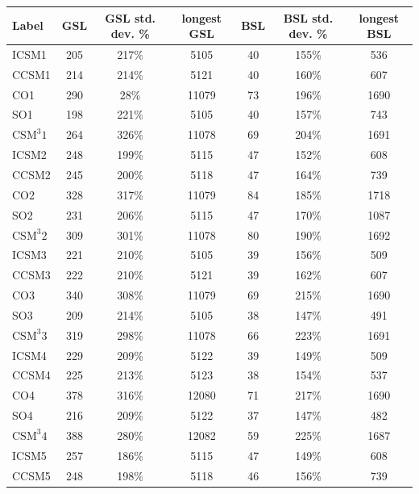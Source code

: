 \documentclass[12pt]{article}
\begin{document}
\begin{table}
  \begin{tabular}{| l | c | c | c | c | c | c |}\hline
    Label & GSL & GSL std. dev. \% & longest GSL & BSL & BSL std. dev. \% & longest BSL  \\\hline
    ICSM1 & 205 & 217\% & 5105 & 40 & 155\% & 536 \\\hline
    CCSM1 & 214 & 214\% & 5121 & 40 & 160\% & 607 \\\hline
    CO1 & 290 & 28\% & 11079 & 73 & 196\% & 1690 \\\hline
    SO1 & 198 & 221\% & 5105 & 40 & 157\% & 743 \\\hline
    $\text{CSM}^{3}1$ & 264 & 326\% & 11078 & 69 & 204\% & 1691 \\\hline\hline
%
    ICSM2 & 248 & 199\% & 5115 & 47 & 152\% & 608 \\\hline
    CCSM2 &245 & 200\% & 5118 & 47 & 164\% & 739 \\\hline
    CO2 & 328 & 317\% & 11079 & 84 & 185\% & 1718 \\\hline
    SO2 & 231 & 206\% & 5115 & 47 & 170\% & 1087 \\\hline
    $\text{CSM}^{3}2$ & 309 & 301\% & 11078 & 80 & 190\% & 1692 \\\hline\hline
%
    ICSM3 & 221 & 210\% & 5105 & 39 & 156\% & 509 \\\hline
    CCSM3 & 222 & 210\% & 5121 & 39 & 162\% & 607 \\\hline
    CO3 & 340 & 308\% & 11079 & 69 & 215\% & 1690 \\\hline
    SO3 & 209 & 214\% & 5105 & 38 & 147\% & 491 \\\hline
    $\text{CSM}^{3}3$ & 319 & 298\% & 11078 & 66 & 223\% & 1691 \\\hline\hline
%
    ICSM4 & 229 & 209\% & 5122 & 39 & 149\% & 509 \\\hline
    CCSM4 & 225 & 213\% & 5123 & 38 & 154\% & 537 \\\hline
    CO4 & 378 & 316\% & 12080 & 71 & 217\% & 1690 \\\hline
    SO4 & 216 & 209\% & 5122 & 37 & 147\% & 482 \\\hline
    $\text{CSM}^{3}4$ & 388 & 280\% & 12082 & 59 & 225\% & 1687 \\\hline\hline
%
    ICSM5 & 257 & 186\% & 5115 & 47 & 149\% & 608 \\\hline
    CCSM5 & 248 & 198\% & 5118 & 46 & 156\% & 739 \\\hline

\end{tabular}
\end{table}
\end{document}
